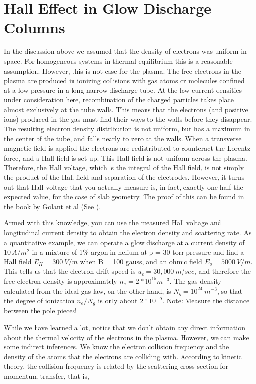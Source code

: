\documentclass{../lab}
\begin{document}
\section{Hall Effect in Glow Discharge Columns}

In the discussion above we assumed that the density of electrons was uniform in space. For homogeneous systems in thermal equilibrium this is a reasonable assumption. However, this is not case for the plasma. The free electrons in the plasma are produced in ionizing collisions with gas atoms or molecules confined at a low pressure in a long narrow discharge tube. At the low current densities under consideration here, recombination of the charged particles takes place almost exclusively at the tube walls. This means that the electrons (and positive ions) produced in the gas must find their ways to the walls before they disappear. The resulting electron density distribution is not uniform, but has a maximum in the center of the tube, and falls nearly to zero at the walls. When a transverse magnetic field is applied the electrons are redistributed to counteract the Lorentz force, and a Hall field is set up. This Hall field is not uniform across the plasma. Therefore, the Hall voltage, which is the integral of the Hall field, is not simply the product of the Hall field and separation of the electrodes. However, it turns out that Hall voltage that you actually measure is, in fact, exactly one-half the expected value, for the case of slab geometry. The proof of this can be found in the book by Golant et al (See ).

Armed with this knowledge, you can use the measured Hall voltage and longitudinal current density to obtain the electron density and scattering rate. As a quantitative example, we can operate a glow discharge at a current density of $10\,A/m^2$ in a mixture of 1\% argon in helium at p = 30 torr pressure and find a Hall field $E_H=300\ V/m$ when B = 100 gauss, and an ohmic field $E_o=5000\ V/m$. This tells us that the electron drift speed is $u_e=30,000\ m/sec$, and therefore the free electron density is approximately $n_e=2*10^{15}m^{-3}$. The gas density calculated from the ideal gas law, on the other hand, is $N_g=10^{24}\ m^{-3}$, so that the degree of ionization $n_e/N_g$ is only about $2*10^{-9}$. Note: Measure the distance between the pole pieces!

While we have learned a lot, notice that we don't obtain any direct information about the thermal velocity of the electrons in the plasma. However, we can make some indirect inferences. We know the electron collision frequency and the density of the atoms that the electrons are colliding with. According to kinetic theory, the collision frequency is related by the scattering cross section for momentum transfer, that is,
\end{document}
